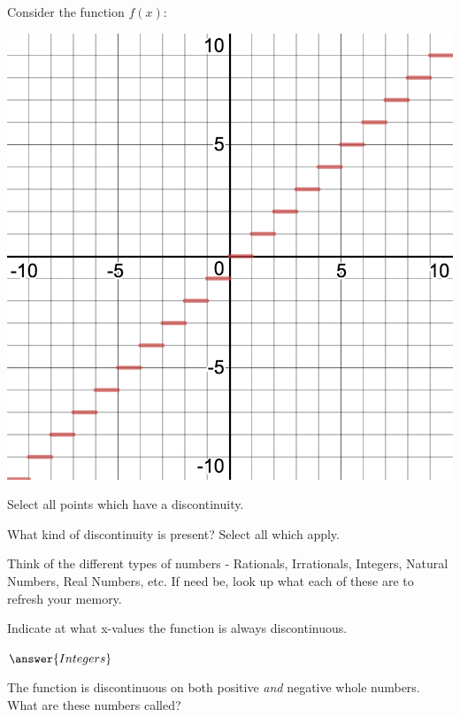 \documentclass{ximera}
\begin{document}
\begin{question}
Consider the function $f(x)$:
\begin{image}
\includegraphics{continuity6}
\end{image}
Select all points which have a discontinuity.

\begin{selectAll}
\end{selectAll}

What kind of discontinuity is present? Select all which apply.

\begin{selectAll}
\end{selectAll}

\begin{hint}
Think of the different types of numbers - Rationals, Irrationals, Integers, Natural Numbers, Real Numbers, etc. If need be, look up what each of these are to refresh your memory.
\end{hint}
Indicate at what x-values the function is always discontinuous.

$\answer{Integers}$
\begin{feedback}
The function is discontinuous on both positive \textit{and} negative whole numbers. What are these numbers called?
\end{feedback}
\end{question}
\end{document}

